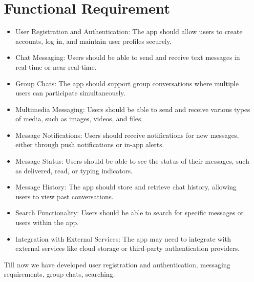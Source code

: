 \section{Functional Requirement}
\vspace{-18pt}
\begin{itemize}
	\item User Registration and Authentication: The app should allow users to create accounts, log in, and maintain user profiles securely.
	\item Chat Messaging: Users should be able to send and receive text messages in real-time or near real-time.
	\item Group Chats: The app should support group conversations where multiple users can participate simultaneously.
	\item Multimedia Messaging: Users should be able to send and receive various types of media, such as images, videos, and files.
	\item Message Notifications: Users should receive notifications for new messages, either through push notifications or in-app alerts.
	\item Message Status: Users should be able to see the status of their messages, such as delivered, read, or typing indicators.
	\item Message History: The app should store and retrieve chat history, allowing users to view past conversations.
	\item Search Functionality: Users should be able to search for specific messages or users within the app.
	\item Integration with External Services: The app may need to integrate with external services like cloud storage or third-party authentication providers.
\end{itemize}
Till now we have developed user registration and authentication, messaging requirements, group chats, searching.

